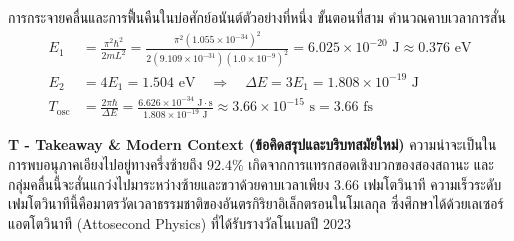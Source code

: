 \begin{psctbox}{การกระจายคลื่นและการฟื้นคืนในบ่อศักย์อนันต์}{ตัวอย่างที่หนึ่ง}
ขั้นตอนที่สาม คำนวณคาบเวลาการสั่น
\begin{align}
E_1 &= \frac{\pi^2\hbar^2}{2m L^2} = \frac{\pi^2 (1.055 \times 10^{-34})^2}{2(9.109 \times 10^{-31})(1.0 \times 10^{-9})^2} = 6.025 \times 10^{-20}\text{ J} \approx 0.376\text{ eV} \\
E_2 &= 4E_1 = 1.504\text{ eV} \quad \Longrightarrow \quad \Delta E = 3E_1 = 1.808 \times 10^{-19}\text{ J} \\
T_{\text{osc}} &= \frac{2\pi\hbar}{\Delta E} = \frac{6.626 \times 10^{-34}\text{ J}\cdot\text{s}}{1.808 \times 10^{-19}\text{ J}} \approx 3.66 \times 10^{-15}\text{ s} = 3.66\text{ fs}
\end{align}

\vspace{6pt}
\noindent\textbf{T - Takeaway \& Modern Context (ข้อคิดสรุปและบริบทสมัยใหม่)} ความน่าจะเป็นในการพบอนุภาคเอียงไปอยู่ทางครึ่งซ้ายถึง $92.4\%$ เกิดจากการแทรกสอดเชิงบวกของสองสถานะ และกลุ่มคลื่นนี้จะสั่นแกว่งไปมาระหว่างซ้ายและขวาด้วยคาบเวลาเพียง $3.66$ เฟมโตวินาที ความเร็วระดับเฟมโตวินาทีนี้คือมาตรวัดเวลาธรรมชาติของอันตรกิริยาอิเล็กตรอนในโมเลกุล ซึ่งศึกษาได้ด้วยเลเซอร์แอตโตวินาที (Attosecond Physics) ที่ได้รับรางวัลโนเบลปี 2023
\end{psctbox}

